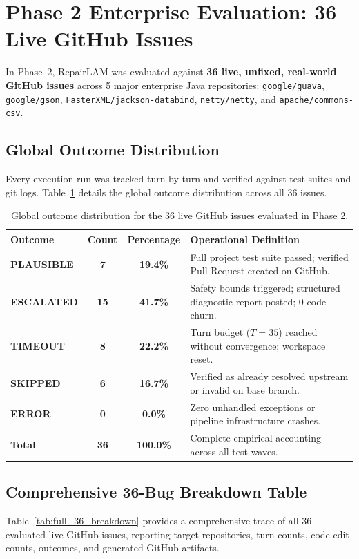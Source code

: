 \documentclass[12pt,a4paper]{report}
\begin{document}
\section{Phase 2 Enterprise Evaluation: 36 Live GitHub Issues}
In Phase~2, RepairLAM was evaluated against \textbf{36 live, unfixed, real-world GitHub issues} across 5 major enterprise Java repositories: \texttt{google/guava}, \texttt{google/gson}, \texttt{FasterXML/jackson-databind}, \texttt{netty/netty}, and \texttt{apache/commons-csv}.

\subsection{Global Outcome Distribution}
Every execution run was tracked turn-by-turn and verified against test suites and git logs. Table~\ref{tab:live_distribution} details the global outcome distribution across all 36 issues.

\begin{table}[htbp]
\centering
\caption{Global outcome distribution for the 36 live GitHub issues evaluated in Phase 2.}
\label{tab:live_distribution}
\begin{tabular}{l c c p{8.5cm}}
\toprule
\textbf{Outcome} & \textbf{Count} & \textbf{Percentage} & \textbf{Operational Definition} \\
\midrule
\textbf{PLAUSIBLE} & \textbf{7} & \textbf{19.4\%} & Full project test suite passed; verified Pull Request created on GitHub. \\
\textbf{ESCALATED} & \textbf{15} & \textbf{41.7\%} & Safety bounds triggered; structured diagnostic report posted; 0 code churn. \\
\textbf{TIMEOUT} & \textbf{8} & \textbf{22.2\%} & Turn budget ($T=35$) reached without convergence; workspace reset. \\
\textbf{SKIPPED} & \textbf{6} & \textbf{16.7\%} & Verified as already resolved upstream or invalid on base branch. \\
\textbf{ERROR} & \textbf{0} & \textbf{0.0\%} & Zero unhandled exceptions or pipeline infrastructure crashes. \\
\midrule
\textbf{Total} & \textbf{36} & \textbf{100.0\%} & Complete empirical accounting across all test waves. \\
\bottomrule
\end{tabular}
\end{table}

\subsection{Comprehensive 36-Bug Breakdown Table}
Table~\ref{tab:full_36_breakdown} provides a comprehensive trace of all 36 evaluated live GitHub issues, reporting target repositories, turn counts, code edit counts, outcomes, and generated GitHub artifacts.
\end{document}
